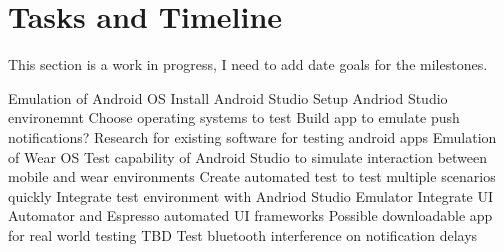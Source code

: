 \section{Tasks and Timeline}
This section is a work in progress, I need to add date goals for the milestones.
\begin{outline}
	\1 Emulation of Android OS
		\2 Install Android Studio
		\2 Setup Andriod Studio environemnt
		\2 Choose operating systems to test
		\2 Build app to emulate push notifications?
		\2 Research for existing software for testing android apps
	\1 Emulation of Wear OS
		\2 Test capability of Android Studio to simulate interaction between mobile and wear environments
	\1 Create automated test to test multiple scenarios quickly
		\2 Integrate test environment with Andriod Studio Emulator
		\2 Integrate UI Automator and Espresso automated UI frameworks
	\1 Possible downloadable app for real world testing
		\2 TBD
	\1 Test bluetooth interference on notification delays
\end{outline}